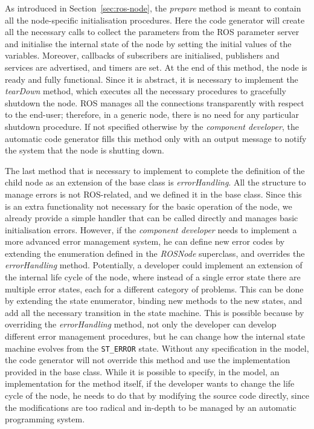 As introduced in Section~\ref{sec:ros-node}, the \textit{prepare} method is meant to contain all the node-specific initialisation procedures. Here the code generator will create all the necessary calls to collect the parameters from the ROS parameter server and initialise the internal state of the node by setting the initial values of the variables. Moreover, callbacks of subscribers are initialised, publishers and services are advertised, and timers are set. At the end of this method, the node is ready and fully functional. Since it is abstract, it is necessary to implement the \textit{tearDown} method, which executes all the necessary procedures to gracefully shutdown the node. ROS manages all the connections transparently with respect to the end-user; therefore, in a generic node, there is no need for any particular shutdown procedure. If not specified otherwise by the \textit{component developer}, the automatic code generator fills this method only with an output message to notify the system that the node is shutting down.

The last method that is necessary to implement to complete the definition of the child node as an extension of the base class is \textit{errorHandling}. All the structure to manage errors is not ROS-related, and we defined it in the base class. Since this is an extra functionality not necessary for the basic operation of the node, we already provide a simple handler that can be called directly and manages basic initialisation errors. However, if the \textit{component developer} needs to implement a more advanced error management system, he can define new error codes by extending the enumeration defined in the \textit{ROSNode} superclass, and overrides the \textit{errorHandling} method. Potentially, a developer could implement an extension of the internal life cycle of the node, where instead of a single error state there are multiple error states, each for a different category of problems. This can be done by extending the state enumerator, binding new methods to the new states, and add all the necessary transition in the state machine. This is possible because by overriding the \textit{errorHandling} method, not only the developer can develop different error management procedures, but he can change how the internal state machine evolves from the \texttt{ST\_ERROR} state. Without any specification in the model, the code generator will not override this method and use the implementation provided in the base class. While it is possible to specify, in the model, an implementation for the method itself, if the developer wants to change the life cycle of the node, he needs to do that by modifying the source code directly, since the modifications are too radical and in-depth to be managed by an automatic programming system.

